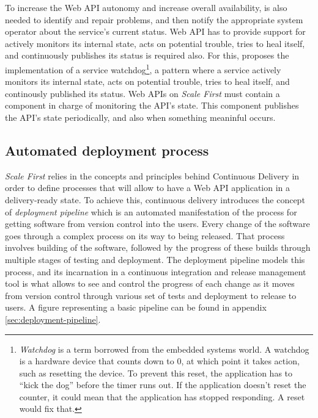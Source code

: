 \documentclass[10pt,article]{IEEEtran}
\begin{document}
To increase the Web API autonomy and increase overall availability, is also needed to identify and repair problems, and then notify the appropriate system operator about the service's current status. Web API has to provide support for actively monitors its internal state, acts on potential trouble, tries to heal itself, and continuously publishes its status is required also. For this, \cite{soapatterns} proposes the implementation of a service watchdog\footnote{\textit{Watchdog} is a term borrowed from the embedded systems world. A watchdog is a hardware device that counts down to 0, at which point it takes action, such as resetting the device. To prevent this reset, the application has to ``kick the dog'' before the timer runs out. If the application doesn't reset the counter, it could mean that the application has stopped responding. A reset would fix that.}, a pattern where a service actively monitors its internal state, acts on potential trouble, tries to heal itself, and continously published its status. Web APIs on \textit{Scale First} must contain a component in charge of monitoring the API's state. This component publishes the API's state periodically, and also when something meaninful occurs.






\subsection{Automated deployment process}
\textit{Scale First} relies in the concepts and principles behind Continuous Delivery\cite{humble} in order to define processes that will allow to have a Web API application in a delivery-ready state. To achieve this, continuous delivery introduces the concept of \textit{deployment pipeline} which is an automated manifestation of the process for getting software from version control into the users. Every change of the software goes through a complex process on its way to being released. That process involves building of the software, followed by the progress of these builds through multiple stages of testing and deployment. The deployment pipeline models this process, and its incarnation in a continuous integration and release management tool is what allows to see and control the progress of each change as it moves from version control through various set of tests and deployment to release to users. A figure representing a basic pipeline can be found in appendix \ref{sec:deployment-pipeline}.
\end{document}

